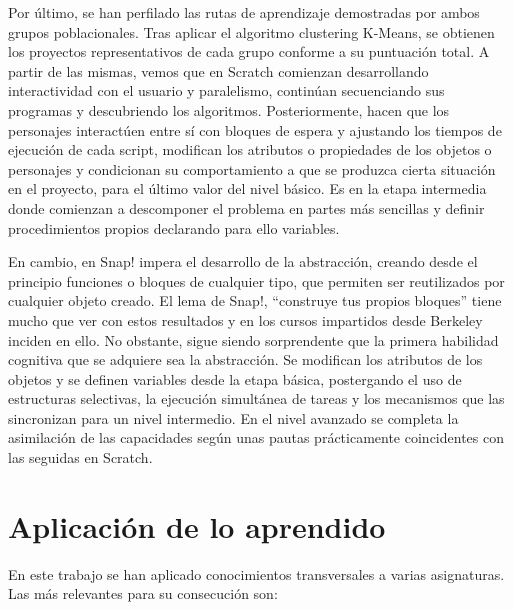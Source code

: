 \documentclass[a4paper, 12pt]{book}
\begin{document}
Por último, se han perfilado las rutas de aprendizaje demostradas por ambos grupos poblacionales. Tras aplicar el algoritmo clustering K-Means, se obtienen los proyectos representativos de cada grupo conforme a su puntuación total. A partir de las mismas, vemos que en Scratch comienzan desarrollando interactividad con el usuario y paralelismo, continúan secuenciando sus programas y descubriendo los algoritmos. Posteriormente, hacen que los personajes interactúen entre sí con bloques de espera y ajustando los tiempos de ejecución de cada script, modifican los atributos o propiedades de los objetos o personajes y condicionan su comportamiento a que se produzca cierta situación en el proyecto, para el último valor del nivel básico. Es en la etapa intermedia donde comienzan a descomponer el problema en partes más sencillas y definir procedimientos propios declarando para ello variables.

En cambio, en Snap! impera el desarrollo de la abstracción, creando desde el principio funciones o bloques de cualquier tipo, que permiten ser reutilizados por cualquier objeto creado. El lema de Snap!, ``construye tus propios bloques'' tiene mucho que ver con estos resultados y en los cursos impartidos desde Berkeley inciden en ello. No obstante, sigue siendo sorprendente que la primera habilidad cognitiva que se adquiere sea la abstracción. Se modifican los atributos de los objetos y se definen variables desde la etapa básica, postergando el uso de estructuras selectivas, la ejecución simultánea de tareas y los mecanismos que las sincronizan para un nivel intermedio. En el nivel avanzado se completa la asimilación de las capacidades según unas pautas prácticamente coincidentes con las seguidas en Scratch.

%

\section{Aplicación de lo aprendido}
\label{sec:aplicacion}

En este trabajo se han aplicado conocimientos transversales a varias asignaturas. Las más relevantes para su consecución son:
\end{document}
